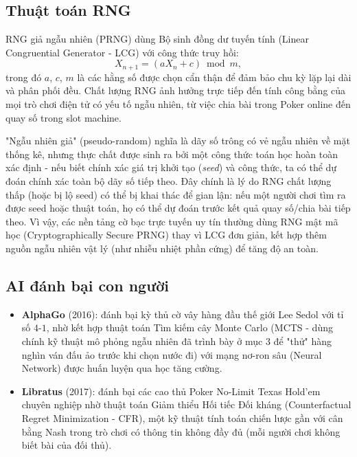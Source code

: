 \documentclass[12pt,a4paper]{article}
\theoremstyle{coloredthm}
\theoremstyle{coloreddef}
\theoremstyle{remark}
\begin{document}
\subsection{Thuật toán RNG}

RNG giả ngẫu nhiên (PRNG) dùng Bộ sinh đồng dư tuyến tính (Linear Congruential Generator - LCG) với công thức truy hồi:
\[
X_{n+1} = (a X_n + c) \bmod m,
\]
trong đó $a$, $c$, $m$ là các hằng số được chọn cẩn thận để đảm bảo chu kỳ lặp lại dài và phân phối đều. Chất lượng RNG ảnh hưởng trực tiếp đến tính công bằng của mọi trò chơi điện tử có yếu tố ngẫu nhiên, từ việc chia bài trong Poker online đến quay số trong slot machine.

\begin{giaithich}
"Ngẫu nhiên giả" (pseudo-random) nghĩa là dãy số trông có vẻ ngẫu nhiên về mặt thống kê, nhưng thực chất được sinh ra bởi một công thức toán học hoàn toàn xác định - nếu biết chính xác giá trị khởi tạo (\emph{seed}) và công thức, ta có thể dự đoán chính xác toàn bộ dãy số tiếp theo. Đây chính là lý do RNG chất lượng thấp (hoặc bị lộ seed) có thể bị khai thác để gian lận: nếu một người chơi tìm ra được seed hoặc thuật toán, họ có thể dự đoán trước kết quả quay số/chia bài tiếp theo. Vì vậy, các nền tảng cờ bạc trực tuyến uy tín thường dùng RNG mật mã học (Cryptographically Secure PRNG) thay vì LCG đơn giản, kết hợp thêm nguồn ngẫu nhiên vật lý (như nhiễu nhiệt phần cứng) để tăng độ an toàn.
\end{giaithich}

\subsection{AI đánh bại con người}

\begin{itemize}
    \item \textbf{AlphaGo} (2016): đánh bại kỳ thủ cờ vây hàng đầu thế giới Lee Sedol với tỉ số $4$-$1$, nhờ kết hợp thuật toán Tìm kiếm cây Monte Carlo (MCTS - dùng chính kỹ thuật mô phỏng ngẫu nhiên đã trình bày ở mục 3 để "thử" hàng nghìn ván đấu ảo trước khi chọn nước đi) với mạng nơ-ron sâu (Neural Network) được huấn luyện qua học tăng cường.
    \item \textbf{Libratus} (2017): đánh bại các cao thủ Poker No-Limit Texas Hold'em chuyên nghiệp nhờ thuật toán Giảm thiểu Hối tiếc Đối kháng (Counterfactual Regret Minimization - CFR), một kỹ thuật tính toán chiến lược gần với cân bằng Nash trong trò chơi có thông tin không đầy đủ (mỗi người chơi không biết bài của đối thủ).
\end{itemize}
\end{document}
